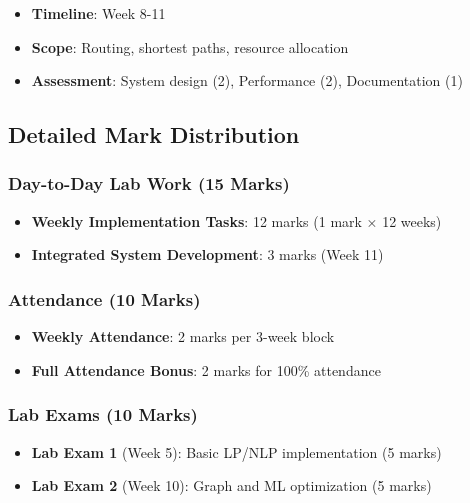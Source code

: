 \documentclass[
  letterpaper,
  DIV=11,
  numbers=noendperiod]{scrreprt}
\providecommand{\tightlist}{%
  \setlength{\itemsep}{0pt}\setlength{\parskip}{0pt}}
\begin{document}
\begin{itemize}
\tightlist
\item
  \textbf{Timeline}: Week 8-11
\item
  \textbf{Scope}: Routing, shortest paths, resource allocation
\item
  \textbf{Assessment}: System design (2), Performance (2), Documentation
  (1)
\end{itemize}

\subsection*{Detailed Mark
Distribution}\label{detailed-mark-distribution}

\subsubsection*{Day-to-Day Lab Work (15
Marks)}\label{day-to-day-lab-work-15-marks}

\begin{itemize}
\tightlist
\item
  \textbf{Weekly Implementation Tasks}: 12 marks (1 mark × 12 weeks)
\item
  \textbf{Integrated System Development}: 3 marks (Week 11)
\end{itemize}

\subsubsection*{Attendance (10 Marks)}\label{attendance-10-marks}

\begin{itemize}
\tightlist
\item
  \textbf{Weekly Attendance}: 2 marks per 3-week block
\item
  \textbf{Full Attendance Bonus}: 2 marks for 100\% attendance
\end{itemize}

\subsubsection*{Lab Exams (10 Marks)}\label{lab-exams-10-marks}

\begin{itemize}
\tightlist
\item
  \textbf{Lab Exam 1} (Week 5): Basic LP/NLP implementation (5 marks)
\item
  \textbf{Lab Exam 2} (Week 10): Graph and ML optimization (5 marks)
\end{itemize}
\end{document}
